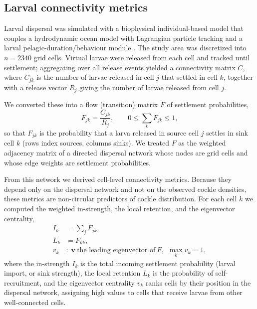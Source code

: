
\subsection{Larval connectivity metrics}

Larval dispersal was simulated with a biophysical individual-based model that
couples a hydrodynamic ocean model with Lagrangian particle tracking and a
larval pelagic-duration/behaviour module \citep{yourABMref}. The study area was
discretized into $n=2340$ grid cells. Virtual larvae were released from each
cell and tracked until settlement; aggregating over all release events yielded a
connectivity matrix $C$, where $C_{jk}$ is the number of larvae released in cell
$j$ that settled in cell $k$, together with a release vector $R_j$ giving the
number of larvae released from cell $j$.

We converted these into a flow (transition) matrix $F$ of settlement
probabilities,
\begin{equation}
F_{jk} = \frac{C_{jk}}{R_j},
\qquad 0 \le \sum_{k} F_{jk} \le 1,
\end{equation}
so that $F_{jk}$ is the probability that a larva released in source cell $j$
settles in sink cell $k$ (rows index sources, columns sinks). We treated $F$ as
the weighted adjacency matrix of a directed dispersal network whose nodes are
grid cells and whose edge weights are settlement probabilities.

From this network we derived cell-level connectivity metrics. Because they depend
only on the dispersal network and not on the observed cockle densities, these
metrics are non-circular predictors of cockle distribution. For each cell $k$ we
computed the weighted in-strength, the local retention, and the eigenvector
centrality,
\begin{align}
I_k &= \sum_{j} F_{jk}, \\
L_k &= F_{kk}, \\
v_k &: \; \mathbf{v}\ \text{the leading eigenvector of}\ F,\ \ \max_k v_k = 1,
\end{align}
where the in-strength $I_k$ is the total incoming settlement probability (larval
import, or sink strength), the local retention $L_k$ is the probability of
self-recruitment, and the eigenvector centrality $v_k$ ranks cells by their
position in the dispersal network, assigning high values to cells that receive
larvae from other well-connected cells.

